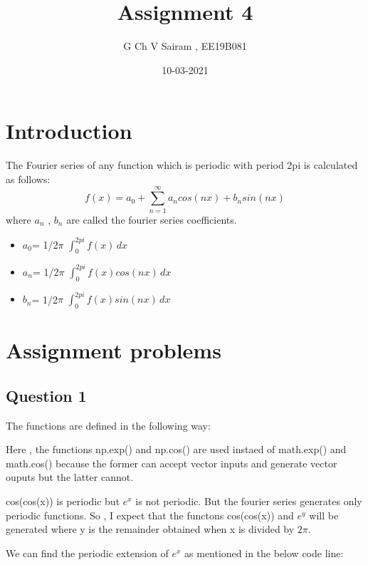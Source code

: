 \documentclass[11pt, a4paper]{article}
\title{Assignment 4}
\author{G Ch V Sairam , EE19B081}
\date{10-03-2021}
\begin{document}
		
\maketitle
\section*{Introduction}
The Fourier series of any function which is periodic with period 2pi is calculated as follows: 
\begin{equation*}
	f(x)=a_0+ \sum_{n=1}^{\infty} {a_n cos(nx)+b_n sin(nx)}
\end{equation*}
where $a_n$ , $b_n$ are called the fourier series coefficients.
\begin{itemize}
  	\item $a_0$= 1/2$\pi$ $ \int_{0}^{2pi} f(x) \,dx $
  	\item $a_n$= 1/2$\pi$ $ \int_{0}^{2pi} f(x)cos(nx) \,dx $
  	\item $b_n$= 1/2$\pi$ $ \int_{0}^{2pi} f(x)sin(nx) \,dx $
\end{itemize}


\section*{Assignment problems}
\subsection*{Question 1}
The functions are defined in the following way:


Here , the functions np.exp() and np.cos() are used instaed of math.exp() and math.cos() because the former can accept vector inputs and generate vector ouputs but the latter cannot.

cos(cos(x)) is periodic but $e^x$ is not periodic. But the fourier series generates only periodic functions. So , I expect that the functons cos(cos(x)) and $e^y$ will be generated where y is the remainder obtained when x is divided by $2\pi$.

We can find the periodic extension of $e^x$ as mentioned in the below code line:

\end{document}
